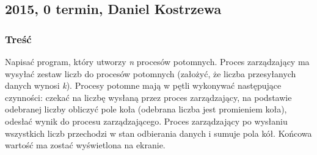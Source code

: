 	\subsection{2015, 0 termin, Daniel Kostrzewa}
		\subsubsection{Treść}
			Napisać program, który utworzy \textit{n} procesów potomnych. Proces zarządzający ma wysyłać zestaw liczb do procesów potomnych (założyć, że liczba przesyłanych danych wynosi \textit{k}).
			Procesy potomne mają w pętli wykonywać następujące czynności: czekać na liczbę wysłaną przez proces zarządzający, na podstawie odebranej liczby obliczyć pole koła (odebrana liczba jest promieniem koła), odesłać wynik do procesu zarządzającego.
			Proces zarządzający po wysłaniu wszystkich liczb przechodzi w stan odbierania danych i sumuje pola kół. Końcowa wartość ma zostać wyświetlona na ekranie.
